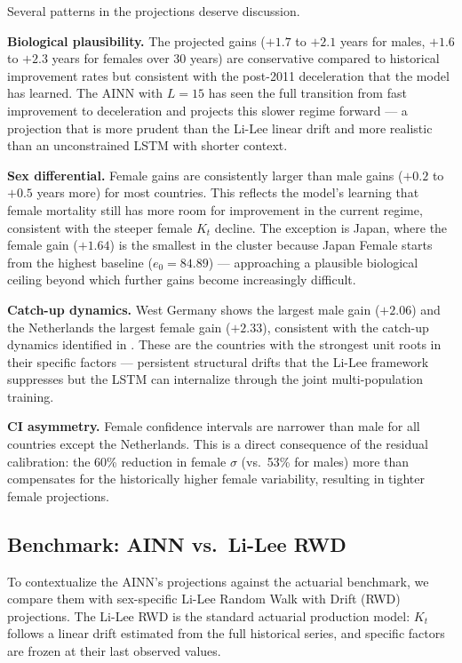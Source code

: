 \documentclass[11pt,a4paper]{article}
\begin{document}
Several patterns in the projections deserve discussion.

\textbf{Biological plausibility.} The projected gains ($+1.7$ to $+2.1$ years for males, $+1.6$ to $+2.3$ years for females over 30 years) are conservative compared to historical improvement rates but consistent with the post-2011 deceleration that the model has learned. The AINN with $L = 15$ has seen the full transition from fast improvement to deceleration and projects this slower regime forward --- a projection that is more prudent than the Li-Lee linear drift and more realistic than an unconstrained LSTM with shorter context.

\textbf{Sex differential.} Female gains are consistently larger than male gains ($+0.2$ to $+0.5$ years more) for most countries. This reflects the model's learning that female mortality still has more room for improvement in the current regime, consistent with the steeper female $K_t$ decline. The exception is Japan, where the female gain ($+1.64$) is the smallest in the cluster because Japan Female starts from the highest baseline ($e_0 = 84.89$) --- approaching a plausible biological ceiling beyond which further gains become increasingly difficult.

\textbf{Catch-up dynamics.} West Germany shows the largest male gain ($+2.06$) and the Netherlands the largest female gain ($+2.33$), consistent with the catch-up dynamics identified in \cite{rindori2026p04}. These are the countries with the strongest unit roots in their specific factors --- persistent structural drifts that the Li-Lee framework suppresses but the LSTM can internalize through the joint multi-population training.

\textbf{CI asymmetry.} Female confidence intervals are narrower than male for all countries except the Netherlands. This is a direct consequence of the residual calibration: the 60\% reduction in female $\sigma$ (vs.\ 53\% for males) more than compensates for the historically higher female variability, resulting in tighter female projections.

\subsection{Benchmark: AINN vs.\ Li-Lee RWD}

To contextualize the AINN's projections against the actuarial benchmark, we compare them with sex-specific Li-Lee Random Walk with Drift (RWD) projections. The Li-Lee RWD is the standard actuarial production model: $K_t$ follows a linear drift estimated from the full historical series, and specific factors are frozen at their last observed values.
\end{document}
